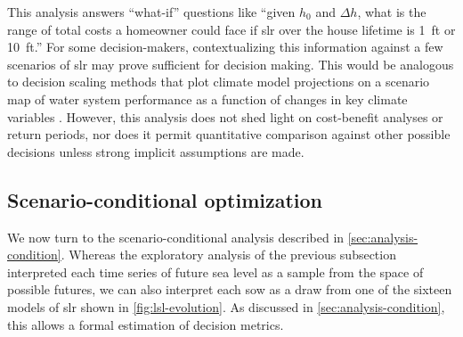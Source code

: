 \documentclass[11pt]{article}
\makeatletter
\DeclareRobustCommand\onedot{\futurelet\@let@token\@onedot}
\def\@onedot{\ifx\@let@token.\else.\null\fi\xspace}
\def\eg{\emph{e.g}\onedot} \def\Eg{\emph{E.g}\onedot}
\DeclareRobustCommand\onedot{\futurelet\@let@token\@onedot}
\def\@onedot{\ifx\@let@token.\else.\null\fi\xspace}
\def\eg{\emph{e.g}\onedot} \def\Eg{\emph{E.g}\onedot}
\makeatother
\begin{document}
This analysis answers ``what-if'' questions like ``given $h_0$ and $\Delta h$, what is the range of total costs a homeowner could face if \gls{slr} over the house lifetime is \SI{1}{ft} or \SI{10}{ft}.''
For some decision-makers, contextualizing this information against a few scenarios of \gls{slr} \citep[\eg, those of][]{sweet_slr:2022} may prove sufficient for decision making.
This would be analogous to decision scaling methods that plot climate model projections on a scenario map of water system performance as a function of changes in key climate variables \citep{Brown:2012kb,Steinschneider:2015kk}.
However, this analysis does not shed light on cost-benefit analyses or return periods, nor does it permit quantitative comparison against other possible decisions unless strong implicit assumptions are made.

\subsection{Scenario-conditional optimization}\label{sec:results-conditional}

We now turn to the scenario-conditional analysis described in \cref{sec:analysis-condition}.
Whereas the exploratory analysis of the previous subsection interpreted each time series of future sea level as a sample from the space of possible futures, we can also interpret each \gls{sow} as a draw from one of the sixteen models of \gls{slr} shown in \cref{fig:lsl-evolution}.
As discussed in \cref{sec:analysis-condition}, this allows a formal estimation of decision metrics.
\end{document}
